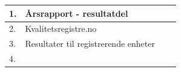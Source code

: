\documentclass{article}
\begin{document}
    \begin{center}
        \begin{tabularx}{\linewidth}{| p{.5cm} | p{6cm} | p{2cm} | X |}
            \hline
            1. & 
                Årsrapport - resultatdel \vspace{\baselineskip} %
                
                
                & 
                
                &
                
                \\ \hline
                
            2. &
                Kvalitetsregistre.no \vspace{\baselineskip} %
                
                
                &

                &
                
                \\ \hline
                
            3. &
                Resultater til registrerende enheter \vspace{\baselineskip} %
                
                
                & 
                
                & 
                
                \\ \hline
                
            4. &
                
                &
                
                &
                
                \\ \hline
    
        \end{tabularx}
    \end{center}
    \newpage
    
\end{document}
